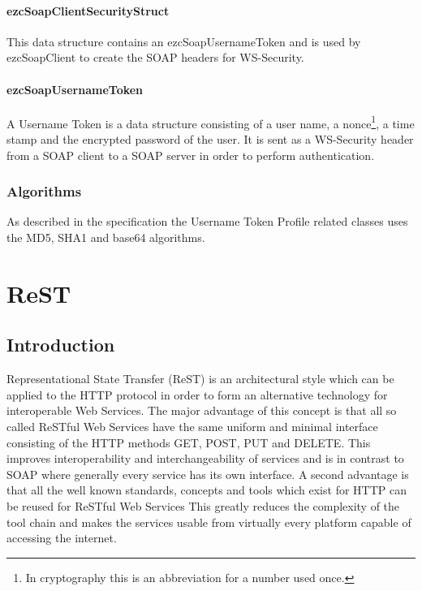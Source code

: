 \documentclass[10pt,final,a4paper,oneside]{article}
\begin{document}
\paragraph{ezcSoapClientSecurityStruct}
This data structure
contains an ezcSoapUsernameToken
and is used by ezcSoapClient
to create the SOAP headers for WS-Security.

\paragraph{ezcSoapUsernameToken}
A Username Token is a data structure
consisting of a user name,
a nonce\footnote{In cryptography this is an abbreviation for a number used once.},
a time stamp
and the encrypted password of the user.
It is sent as a WS-Security header
from a SOAP client to a SOAP server
in order to perform authentication.


\subsubsection{Algorithms}
As described in the specification
the Username Token Profile related
classes uses the MD5, SHA1 and base64 algorithms.






\section{ReST}\label{sec:ReST}
%
\subsection{Introduction}
Representational State Transfer (ReST) is an architectural style
which can be applied to the HTTP protocol \cite{HTTP}
in order to form an alternative technology
for interoperable Web Services.
The major advantage of this concept is
that all so called ReSTful Web Services have
the same uniform and minimal interface
consisting of the HTTP methods
GET, POST, PUT and DELETE.
This improves interoperability
and interchangeability of services and 
is in contrast to SOAP where generally every service
has its own interface.
A second advantage is that all the well known standards, concepts and tools
which exist for HTTP can be reused for ReSTful Web Services
This greatly reduces the complexity of the tool chain
and makes the services usable from virtually
every platform capable of accessing the internet.
\end{document}
